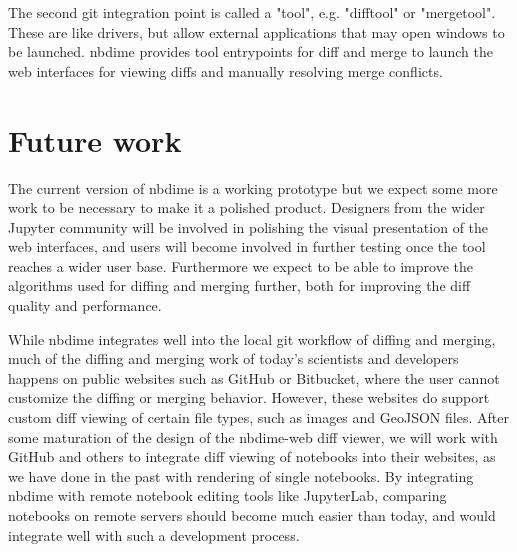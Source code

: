 \documentclass{deliverablereport}
\begin{document}
The second git integration point is called a "tool", e.g. "difftool" or "mergetool".
These are like drivers, but allow external applications that may open windows to be launched.
nbdime provides tool entrypoints for diff and merge to launch the web interfaces for viewing diffs
and manually resolving merge conflicts.



\section{Future work}

The current version of nbdime is a working prototype but we expect
some more work to be necessary to make it a polished product.
Designers from the wider Jupyter community will be involved in
polishing the visual presentation of the web interfaces,
and users will become involved in further testing once the tool
reaches a wider user base. Furthermore we expect to be able to
improve the algorithms used for diffing and merging further,
both for improving the diff quality and performance.

While nbdime integrates well into the local git workflow of diffing and merging,
much of the diffing and merging work of today's scientists and developers happens
on public websites such as GitHub or Bitbucket,
where the user cannot customize the diffing or merging behavior.
However, these websites do support custom diff viewing of certain file types,
such as images and GeoJSON files.
After some maturation of the design of the nbdime-web diff viewer,
we will work with GitHub and others to integrate diff viewing of notebooks into their websites,
as we have done in the past with rendering of single notebooks.
By integrating nbdime with remote notebook editing tools like JupyterLab, comparing notebooks on remote servers should become much easier than today, and would integrate well with such a development process.
\end{document}
